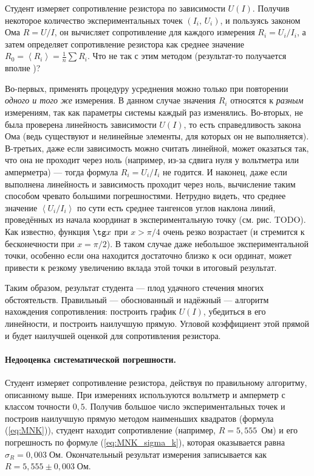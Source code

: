 Студент измеряет сопротивление резистора по зависимости $U\!\left(I\right)$.
Получив некоторое количество экспериментальных точек
$\left(I_{i},\,U_{i}\right)$,
и пользуясь законом Ома $R=U/I$, он вычисляет сопротивление для каждого
измерения $R_{i}=U_{i}/I_{i}$, а затем определяет сопротивление резистора
как среднее значение $R_{0}=\left\langle R_{i}\right\rangle =\frac{1}{n}\sum
R_{i}$.
Что не так с этим методом (результат-то получается вполне )?

\begin{longnote}
    Во-первых, применять процедуру усреднения можно только
    при повторении \emph{одного и того же} измерения. В данном случае значения
$R_{i}$
    относятся к \emph{разным} измерениям, так как параметры системы каждый раз
изменялись.
    Во-вторых, не была проверена линейность зависимости $U\left(I\right)$, то
есть
    справедливость закона Ома (ведь существуют и нелинейные элементы,
    для которых он не выполняется). В-третьих, даже если зависимость
    можно считать линейной, может оказаться так, что она не проходит через
    ноль (например, из-за сдвига нуля у вольтметра или амперметра) ---
    тогда формула $R_{i}=U_{i}/I_{i}$ не годится.
    И наконец, даже если выполнена линейность и зависимость проходит через
    ноль, вычисление таким способом чревато большими погрешностями. Нетрудно
    видеть, что среднее значение $\left\langle U_{i}/I_{i}\right\rangle $
    по сути есть среднее тангенсов углов наклона линий, проведённых из
    начала координат в экспериментальную точку (см. рис. TODO). Как известно,
    функция $\tg x$ при $x>\pi/4$ очень резко возрастает (и стремится
    к бесконечности при $x=\pi/2$). В таком случае даже небольшое 
    экспериментальной точки, особенно если она находится достаточно близко
    к оси ординат, может привести к резкому увеличению вклада этой точки
    в итоговый результат.

    Таким образом,  результат студента --- плод удачного стечения
многих
    обстоятельств. Правильный --- обоснованный и надёжный --- алгоритм
    нахождения сопротивления: построить график $U\left(I\right)$, убедиться
    в его линейности, и построить наилучшую прямую. 
    Угловой коэффициент этой прямой и будет наилучшей оценкой 
    для сопротивления резистора.
\end{longnote}

\paragraph{Недооценка систематической погрешности.}
Студент измеряет сопротивление резистора, действуя по правильному
алгоритму, описанному выше. При измерениях используются вольтметр
и амперметр с классом точности $0{,}5$. Получив большое число экспериментальных
точек и построив наилучшую прямую методом наименьших квадратов (формула
(\ref{eq:MNK})), студент находит сопротивление (например, $R=5{,}555$~Ом)
и его погрешность по формуле (\ref{eq:MNK_sigma_k}), которая оказывается
равна $\sigma_{R}=0{,}003\;\text{Ом}.$ Окончательный результат измерения
записывается как $R=5{,}555\pm0{,}003\;\text{Ом}$.

